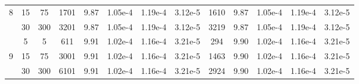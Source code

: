 \begin{table}[ht]
\begin{tabular}{|c|c|c|c|c|c|c|c|c|c|c|c|c|}
    8 & 15 & 75  & 1701 & 9.87 & 1.05e-4 & 1.19e-4 & 3.12e-5 & 1610 & 9.87 & 1.05e-4 & 1.19e-4 & 3.12e-5 \\
      & 30 & 300 & 3201 & 9.87 & 1.05e-4 & 1.19e-4 & 3.12e-5 & 3219 & 9.87 & 1.05e-4 & 1.19e-4 & 3.12e-5 \\
    \hline
      & 5  & 5   & 611  & 9.91 & 1.02e-4 & 1.16e-4 & 3.21e-5 & 294  & 9.90 & 1.02e-4 & 1.16e-4 & 3.21e-5 \\
    9 & 15 & 75  & 3001 & 9.91 & 1.02e-4 & 1.16e-4 & 3.21e-5 & 1463 & 9.90 & 1.02e-4 & 1.16e-4 & 3.21e-5 \\
      & 30 & 300 & 6101 & 9.91 & 1.02e-4 & 1.16e-4 & 3.21e-5 & 2924 & 9.90 & 1.02e-4 & 1.16e-4 & 3.21e-5 \\
    \hline
\end{tabular}
\label{tab:DumuxVsMatlab}
\end{table}


